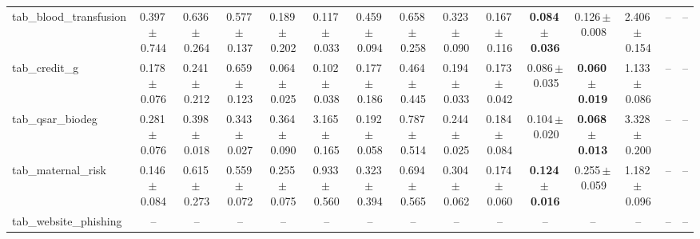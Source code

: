 \documentclass[8pt]{extarticle}
\begin{document}
\begin{longtable}{l*{14}{c}}
tab\_blood\_transfusion & 0.397\,$\pm$\,0.744 & 0.636\,$\pm$\,0.264 & 0.577\,$\pm$\,0.137 & 0.189\,$\pm$\,0.202 & 0.117\,$\pm$\,0.033 & 0.459\,$\pm$\,0.094 & 0.658\,$\pm$\,0.258 & 0.323\,$\pm$\,0.090 & 0.167\,$\pm$\,0.116 & \textbf{0.084\,$\pm$\,0.036} & 0.126\,$\pm$\,0.008 & 2.406\,$\pm$\,0.154 & -- & -- \\
tab\_credit\_g & 0.178\,$\pm$\,0.076 & 0.241\,$\pm$\,0.212 & 0.659\,$\pm$\,0.123 & 0.064\,$\pm$\,0.025 & 0.102\,$\pm$\,0.038 & 0.177\,$\pm$\,0.186 & 0.464\,$\pm$\,0.445 & 0.194\,$\pm$\,0.033 & 0.173\,$\pm$\,0.042 & 0.086\,$\pm$\,0.035 & \textbf{0.060\,$\pm$\,0.019} & 1.133\,$\pm$\,0.086 & -- & -- \\
tab\_qsar\_biodeg & 0.281\,$\pm$\,0.076 & 0.398\,$\pm$\,0.018 & 0.343\,$\pm$\,0.027 & 0.364\,$\pm$\,0.090 & 3.165\,$\pm$\,0.165 & 0.192\,$\pm$\,0.058 & 0.787\,$\pm$\,0.514 & 0.244\,$\pm$\,0.025 & 0.184\,$\pm$\,0.084 & 0.104\,$\pm$\,0.020 & \textbf{0.068\,$\pm$\,0.013} & 3.328\,$\pm$\,0.200 & -- & -- \\
tab\_maternal\_risk & 0.146\,$\pm$\,0.084 & 0.615\,$\pm$\,0.273 & 0.559\,$\pm$\,0.072 & 0.255\,$\pm$\,0.075 & 0.933\,$\pm$\,0.560 & 0.323\,$\pm$\,0.394 & 0.694\,$\pm$\,0.565 & 0.304\,$\pm$\,0.062 & 0.174\,$\pm$\,0.060 & \textbf{0.124\,$\pm$\,0.016} & 0.255\,$\pm$\,0.059 & 1.182\,$\pm$\,0.096 & -- & -- \\
tab\_website\_phishing & -- & -- & -- & -- & -- & -- & -- & -- & -- & -- & -- & -- & -- & -- \\
\end{longtable}
\end{document}
